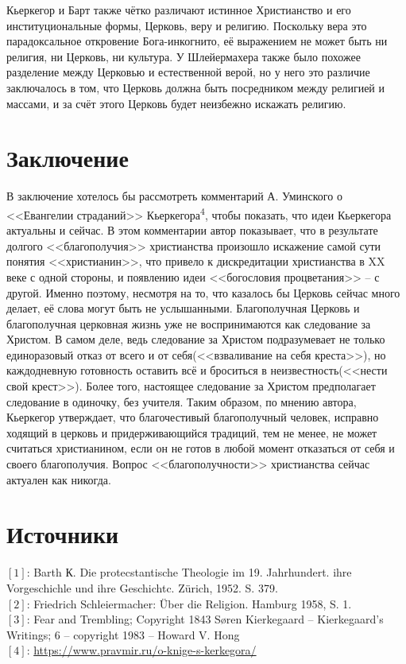 \documentclass[11pt]{article}
\begin{document}
Кьеркегор и Барт также чётко различают истинное Христианство и его институциональные формы,
Церковь, веру и религию. Поскольку вера это парадоксальное откровение Бога-инкогнито, её
выражением не может быть ни религия, ни Церковь, ни культура. У Шлейермахера также было
похожее разделение между Церковью и естественной верой, но у него это различие заключалось
в том, что Церковь должна быть посредником между религией и массами, и за счёт этого Церковь
будет неизбежно искажать религию.
\section{Заключение}
\label{sec:orgd35537a}
В заключение хотелось бы рассмотреть комментарий А. Уминского о {}<<Евангелии страданий>>{} Кьеркегора\textsuperscript{4},
чтобы показать, что идеи Кьеркегора актуальны и сейчас. В этом комментарии автор показывает,
что в результате долгого {}<<благополучия>>{} христианства произошло искажение самой
сути понятия {}<<христианин>>{}, что привело к дискредитации христианства в XX веке с одной стороны,
и появлению идеи {}<<богословия процветания>>{} -- с другой. Именно поэтому, несмотря на то, что
казалось бы Церковь сейчас много делает, её слова могут быть не услышанными. Благополучная Церковь
и благополучная церковная жизнь уже не воспринимаются как следование за Христом. В самом деле, ведь
следование за Христом подразумевает не только единоразовый отказ от всего и от себя({}<<взваливание на
себя креста>>{}), но каждодневную готовность оставить всё и броситься в неизвестность({}<<нести свой крест>>{}).
Более того, настоящее следование за Христом предполагает следование в одиночку, без учителя. Таким
образом, по мнению автора, Кьеркегор утверждает, что благочестивый благополучный человек, исправно
ходящий в церковь и придерживающийся традиций, тем не менее, не может считаться христианином, если он
не готов в любой момент отказаться от себя и своего благополучия. Вопрос {}<<благополучности>>{} христианства
сейчас актуален как никогда.
\section{Источники}
\label{sec:orgfd4a931}
\([1]\): Barth К. Die protecstantische Theologie im 19. Jahrhundert. ihre Vorgeschichle und ihre Geschichtc. Zürich, 1952. S. 379. \\
\([2]\): Friedrich Schleiermacher: Über die Religion. Hamburg 1958, S. 1.\\
\([3]\): Fear and Trembling; Copyright 1843 Søren Kierkegaard – Kierkegaard's Writings; 6 – copyright 1983 – Howard V. Hong\\
\([4]\): \url{https://www.pravmir.ru/o-knige-s-kerkegora/}
\end{document}
